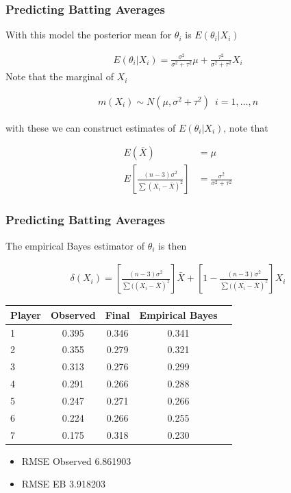\documentclass[
  shownotes,
  xcolor={svgnames},
  hyperref={colorlinks,citecolor=DarkBlue,linkcolor=DarkRed,urlcolor=DarkBlue}
  ]{beamer}
\begin{document}
\begin{frame}[fragile]
\frametitle{Predicting Batting Averages}
With this model the posterior mean for $\theta_i$ is $E(\theta_i|X_i)$

\begin{align}
E(\theta_i|X_i)=\frac{\sigma^2}{\sigma^2+\tau^2}\mu + \frac{\tau^2}{\sigma^2+\tau^2} X_i
\end{align}
Note that the marginal of $X_i$

\begin{align}
m(X_i)\sim N(\mu,\sigma^2+\tau^2)\,\,\,i=1,\dots,n
\end{align}

with these we can construct estimates of $E(\theta_i|X_i)$, note that

\begin{align}
E(\bar X)&=\mu \\
E\left[ \frac{(n-3)\sigma^2}{\sum(X_i-\bar X)^2}\right]&=\frac{\sigma^2}{\sigma^2+\tau^2}
\end{align}



\end{frame}
\begin{frame}[fragile]
\frametitle{Predicting Batting Averages}

The empirical Bayes estimator of $\theta_i$ is then
\begin{footnotesize}
  \begin{align}
    \delta(X_i)= \left[ \frac{(n-3)\sigma^2}{\sum((X_i-\bar X)^2}\right] \bar X + \left[ 1- \frac{(n-3)\sigma^2}{\sum((X_i-\bar X)^2}\right] X_i
  \end{align}
\end{footnotesize}


\begin{table}[]
\begin{tabular}{lcccc}
\hline
\hline
Player & Observed & Final & Empirical Bayes  \\
\hline
1      & 0.395    & 0.346 & 0.341            \\
2      & 0.355    & 0.279 & 0.321            \\
3      & 0.313    & 0.276 & 0.299            \\
4      & 0.291    & 0.266 & 0.288            \\
5      & 0.247    & 0.271 & 0.266            \\
6      & 0.224    & 0.266 & 0.255            \\
7      & 0.175    & 0.318 & 0.230           \\
\hline
\hline
\end{tabular}
\end{table}

\begin{itemize}
\item RMSE Observed 6.861903
\item RMSE EB 3.918203
\end{itemize}
\end{frame}
\end{document}
